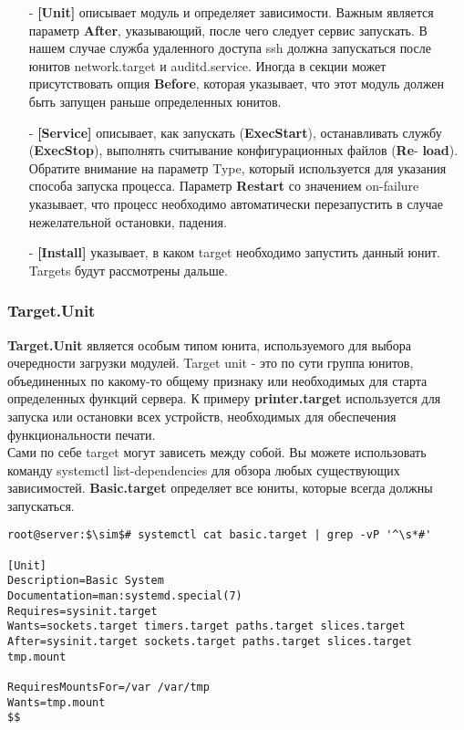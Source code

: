 \documentclass[14pt, a4paper]{article}
\begin{document}
\begin{itemize}
    \item[-] \textbf{[Unit]} описывает модуль и определяет зависимости. Важным является параметр \textbf{After},
    указывающий, после чего следует сервис запускать. В нашем случае служба удаленного
    доступа ssh должна запускаться после юнитов \colorbox{backcolour}{network.target} и \colorbox{backcolour}{auditd.service}.
    Иногда в секции может присутствовать опция \textbf{Before}, которая указывает, что этот модуль
    должен быть запущен раньше определенных юнитов.
    \item[-] \textbf{[Service]} описывает, как запускать (\textbf{ExecStart}), останавливать службу (\textbf{ExecStop}), выполнять
    считывание конфигурационных файлов (\textbf{Re}- \textbf{load}). Обратите внимание на параметр Type,
    который используется для указания способа запуска процесса. Параметр \textbf{Restart} со
    значением \colorbox{backcolour}{on-failure} указывает, что процесс необходимо автоматически перезапустить в
    случае нежелательной остановки, падения.
    \item[-] \textbf{[Install]} указывает, в каком target необходимо запустить данный юнит. Targets будут
    рассмотрены дальше.
\end{itemize}

\subsubsection*{Target.Unit} 

\textbf{Target.Unit} является особым типом юнита, используемого для выбора очередности загрузки модулей.
Target unit - это по сути группа юнитов, объединенных по какому-то общему признаку или
необходимых для старта определенных функций сервера. К примеру \textbf{printer.target} используется для
запуска или остановки всех устройств, необходимых для обеспечения функциональности печати.\\

Сами по себе target могут зависеть между собой. Вы можете использовать команду \colorbox{backcolour}{systemctl
list-dependencies} для обзора любых существующих зависимостей. \textbf{Basic.target} определяет все
юниты, которые всегда должны запускаться.

\vspace{0.3cm}

\begin{lstlisting}
root@server:$\sim$# systemctl cat basic.target | grep -vP '^\s*#'

[Unit]
Description=Basic System
Documentation=man:systemd.special(7)
Requires=sysinit.target
Wants=sockets.target timers.target paths.target slices.target
After=sysinit.target sockets.target paths.target slices.target tmp.mount

RequiresMountsFor=/var /var/tmp
Wants=tmp.mount
$$
\end{lstlisting}
\vspace{0.2cm}
\end{document}

